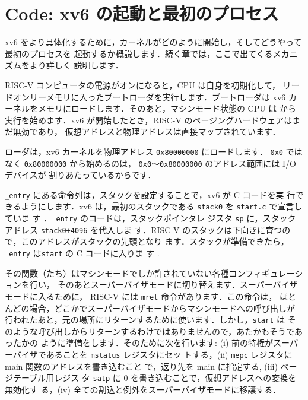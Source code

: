 \section{Code: xv6 の起動と最初のプロセス}
xv6 をより具体化するために，カーネルがどのように開始し，そしてどうやって最初のプロセスを
起動するか概説します．続く章では，ここで出てくるメカニズムをより詳しく
説明します．

RISC-V コンピュータの電源がオンになると，CPU は自身を初期化して，
リードオンリーメモリに入ったブートローダを実行します．ブートローダは
xv6 カーネルをメモリにロードします．そのあと，マシンモード状態の
CPU は   から
実行を始めます．xv6 が開始したとき，RISC-V のページングハードウェアはまだ無効であり，
仮想アドレスと物理アドレスは直接マップされています．


ローダは，xv6 カーネルを物理アドレス \texttt{0x80000000} にロードします．
\texttt{0x0} ではなく \texttt{0x80000000} から始めるのは，
\texttt{0x0}〜\texttt{0x80000000} のアドレス範囲には I/O デバイスが
割りあたっているからです．

\lstinline{_entry} にある命令列は，スタックを設定することで，xv6 が C コードを実
行できるようにします．xv6 は，最初のスタックである \lstinline{stack0}
を \lstinline{start.c} で宣言していま
す ．\lstinline{_entry} のコードは，スタックポインタレ
ジスタ \lstinline{sp} に，スタックアドレス \lstinline{stack0+4096} を代入しま
す．RISC-V のスタックは下向きに育つので，このアドレスがスタックの先頭となり
ます．スタックが準備できたら，\lstinline{_entry} は\lstinline{start} の C コードに入りま
す .

その関数（たち）はマシンモードでしか許されていない各種コンフィギュレーションを行い，
そのあとスーパーバイザモードに切り替えます．スーパーバイザモードに入るために，
RISC-V には \lstinline{mret} 命令があります．この命令は，
ほとんどの場合，どこかでスーパーバイザモードからマシンモードへの呼び出しが
行われたあと，元の場所にリターンするために使います．しかし，\lstinline{start} は
そのような呼び出しからリターンするわけではありませんので，あたかもそうであったかの
ように準備をします．そのために次を行います: 
(i) 前の特権がスーパーバイザであることを \lstinline{mstatus} レジスタにセッ
トする，(ii) \lstinline{mepc} レジスタに main 関数のアドレスを書き込むこと
で，返り先を main に指定する, (iii) ページテーブル用レジス
タ \lstinline{satp} に 0 を書き込むことで，仮想アドレスへの変換を無効化す
る，(iv) 全ての割込と例外をスーパーバイザモードに移譲する．

